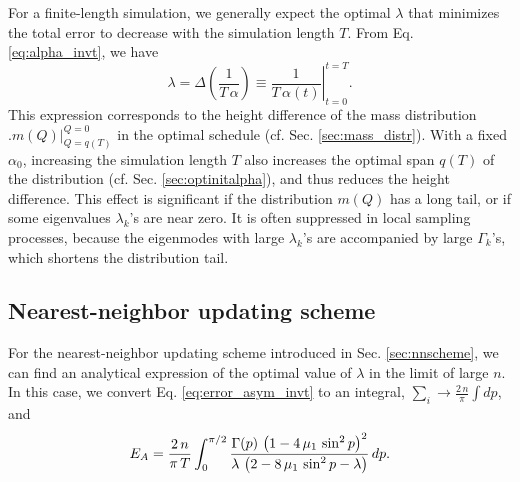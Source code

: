 \documentclass[preprint, floatfix]{revtex4-1}
\newcommand{\Err}{E}
\begin{document}
For a finite-length simulation,
we generally expect the optimal $\lambda$
that minimizes the total error to
decrease with the simulation length $T$.
%
From Eq. \eqref{eq:alpha_invt}, we have
$$
  \lambda
  =
  \Delta \left( \frac{ 1 } { T \, \alpha } \right)
  \equiv
  \left.
  \frac { 1 } { T \, \alpha(t) }
  \right|_{t = 0}^{t = T}
  .
$$
This expression corresponds to the height difference
of the mass distribution
$
\bigl. m(Q) \bigr|_{Q = q(T)}^{Q = 0}
$
in the optimal schedule
(cf. Sec. \ref{sec:mass_distr}).
%
With a fixed $\alpha_0$,
increasing the simulation length $T$
also increases the optimal span $q(T)$ of the distribution
(cf. Sec. \ref{sec:optinitalpha}),
and thus reduces the height difference.
%
This effect is significant
if the distribution $m(Q)$ has a long tail,
or if some eigenvalues $\lambda_k$'s are near zero.
%
It is often suppressed in local sampling processes,
because the eigenmodes with large $\lambda_k$'s
are accompanied by large $\Gamma_k$'s,
which shortens the distribution tail.





\subsection{Nearest-neighbor updating scheme}


For the nearest-neighbor updating scheme
introduced in Sec. \ref{sec:nnscheme},
we can find an analytical expression
of the optimal value of $\lambda$
in the limit of large $n$.
%
In this case,
we convert Eq.
\eqref{eq:error_asym_invt}
to an integral,
$\sum_i \to \frac{2 \, n}{\pi} \int dp$, and
%
\begin{align}
\Err_A
=
\frac{2 \, n}{\pi \, T}
\int_0^{\pi/2}
  \frac{ \Gamma(p) \, \left(1 - 4 \, \mu_1 \, \sin^2 p \right)^2    }
       {   \lambda \, \left(2 - 8 \, \mu_1 \, \sin^2 p - \lambda \right) }
\, dp.
\notag
\end{align}
\end{document}
